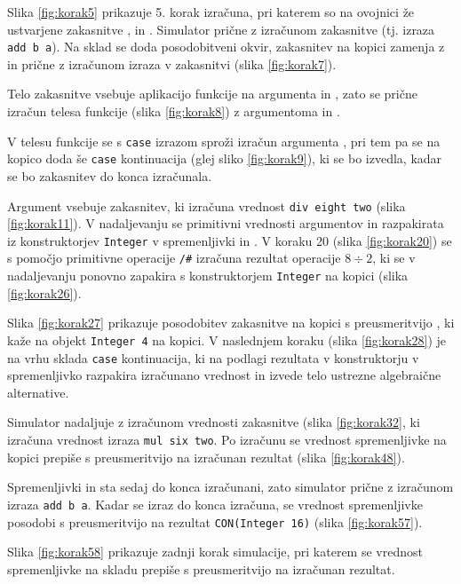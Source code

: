 Slika \ref{fig:korak5} prikazuje 5. korak izračuna, pri katerem so na ovojnici že ustvarjene zakasnitve ,  in . Simulator prične z izračunom zakasnitve  (tj. izraza \texttt{add b a}). Na sklad se doda posodobitveni okvir, zakasnitev  na kopici zamenja z  in prične z izračunom izraza v zakasnitvi (slika \ref{fig:korak7}).

Telo zakasnitve  vsebuje aplikacijo funkcije  na argumenta  in , zato se prične izračun telesa funkcije  (slika \ref{fig:korak8}) z argumentoma  in .

V telesu funkcije se s \texttt{case} izrazom sproži izračun argumenta , pri tem pa se na kopico doda še \texttt{case} kontinuacija (glej sliko \ref{fig:korak9}), ki se bo izvedla, kadar se bo zakasnitev  do konca izračunala.

Argument  vsebuje zakasnitev, ki izračuna vrednost \texttt{div eight two} (slika \ref{fig:korak11}). V nadaljevanju se primitivni vrednosti argumentov  in  razpakirata iz konstruktorjev \texttt{Integer} v spremenljivki  in . V koraku 20 (slika \ref{fig:korak20}) se s pomočjo primitivne operacije \texttt{/\#} izračuna rezultat operacije $8 \div 2$, ki se v nadaljevanju ponovno zapakira s konstruktorjem \texttt{Integer} na kopici (slika \ref{fig:korak26}).

Slika \ref{fig:korak27} prikazuje posodobitev zakasnitve  na kopici s preusmeritvijo , ki kaže na objekt \texttt{Integer 4} na kopici. V naslednjem koraku (slika \ref{fig:korak28}) je na vrhu sklada \texttt{case} kontinuacija, ki na podlagi rezultata v konstruktorju  v spremenljivko  razpakira izračunano vrednost in izvede telo ustrezne algebraične alternative.

Simulator nadaljuje z izračunom vrednosti zakasnitve  (slika \ref{fig:korak32}, ki izračuna vrednost izraza \texttt{mul six two}. Po izračunu se vrednost spremenljivke  na kopici prepiše s preusmeritvijo na izračunan rezultat (slika \ref{fig:korak48}).

Spremenljivki  in  sta sedaj do konca izračunani, zato simulator prične z izračunom izraza \texttt{add b a}. Kadar se izraz do konca izračuna, se vrednost spremenljivke  posodobi s preusmeritvijo na rezultat \texttt{CON(Integer 16)} (slika \ref{fig:korak57}).

Slika \ref{fig:korak58} prikazuje zadnji korak simulacije, pri katerem se vrednost spremenljivke  na skladu prepiše s preusmeritvijo na izračunan rezultat.

